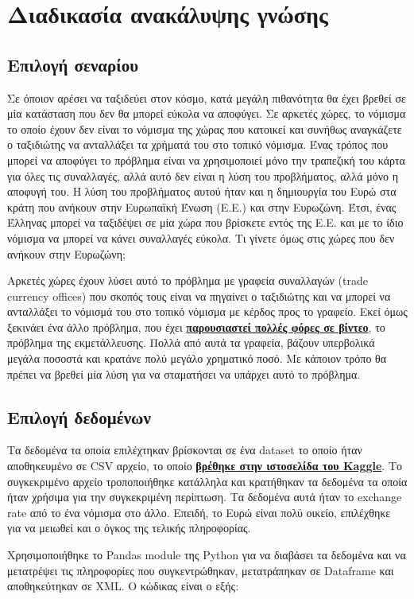 \label{Chapter1}

\section{Διαδικασία ανακάλυψης γνώσης}

\subsection{Επιλογή σεναρίου}
\label{chap:problem}

Σε όποιον αρέσει να ταξιδεύει στον κόσμο, κατά μεγάλη πιθανότητα θα έχει βρεθεί σε μία κατάσταση που δεν θα μπορεί εύκολα να αποφύγει. Σε αρκετές χώρες, το νόμισμα το οποίο έχουν δεν είναι το νόμισμα της χώρας που κατοικεί και συνήθως αναγκάζετε ο ταξιδιώτης να ανταλλάξει τα χρήματά του στο τοπικό νόμισμα. Ένας τρόπος που μπορεί να αποφύγει το πρόβλημα είναι να χρησιμοποιεί μόνο την τραπεζική του κάρτα για όλες τις συναλλαγές, αλλά αυτό δεν είναι η λύση του προβλήματος, αλλά μόνο η αποφυγή του. Η λύση του προβλήματος αυτού ήταν και η δημιουργία του Ευρώ στα κράτη που ανήκουν στην Ευρωπαϊκή Ένωση (Ε.Ε.) και στην Ευρωζώνη. Έτσι, ένας Έλληνας μπορεί να ταξιδέψει σε μία χώρα που βρίσκετε εντός της Ε.Ε. και με το ίδιο νόμισμα να μπορεί να κάνει συναλλαγές εύκολα. Τι γίνετε όμως στις χώρες που δεν ανήκουν στην Ευρωζώνη; \par
Αρκετές χώρες έχουν λύσει αυτό το πρόβλημα με γραφεία συναλλαγών (trade currency offices) που σκοπός τους είναι να πηγαίνει ο ταξιδιώτης και να μπορεί να ανταλλάξει το νόμισμά του στο τοπικό νόμισμα με κέρδος προς το γραφείο. Εκεί όμως ξεκινάει ένα άλλο πρόβλημα, που έχει \href{https://www.youtube.com/watch?v=6zwiArr3jYE}{\textbf{παρουσιαστεί πολλές φόρες σε βίντεο}}, το πρόβλημα της εκμετάλλευσης. Πολλά από αυτά τα γραφεία, βάζουν υπερβολικά μεγάλα ποσοστά και κρατάνε πολύ μεγάλο χρηματικό ποσό. Με κάποιον τρόπο θα πρέπει να βρεθεί μία λύση για να σταματήσει να υπάρχει αυτό το πρόβλημα.

\subsection{Επιλογή δεδομένων}

Τα δεδομένα τα οποία επιλέχτηκαν βρίσκονται σε ένα dataset το οποίο ήταν αποθηκευμένο σε CSV αρχείο, το οποίο \href{https://www.kaggle.com/dhruvildave/currency-exchange-rates}{\textbf{βρέθηκε στην ιστοσελίδα του Kaggle}}. Το συγκεκριμένο αρχείο τροποποιήθηκε κατάλληλα και κρατήθηκαν τα δεδομένα τα οποία ήταν χρήσιμα για την συγκεκριμένη περίπτωση. Τα δεδομένα αυτά ήταν το exchange rate από το ένα νόμισμα στο άλλο. Επειδή, το Ευρώ είναι πολύ οικείο, επιλέχθηκε για να μειωθεί και ο όγκος της τελικής πληροφορίας.  \par
Χρησιμοποιήθηκε το Pandas module της Python για να διαβάσει τα δεδομένα και να μετατρέψει τις πληροφορίες που συγκεντρώθηκαν, μετατράπηκαν σε Dataframe και αποθηκεύτηκαν σε XML. Ο κώδικας είναι ο εξής:

